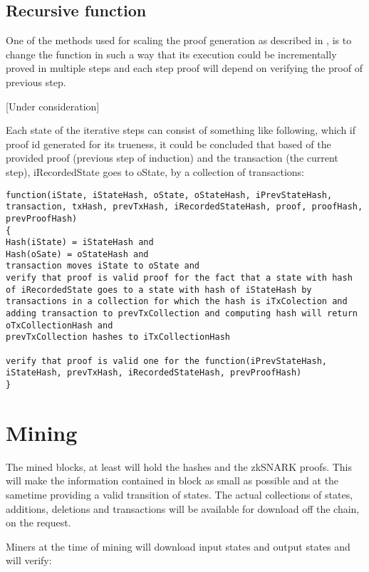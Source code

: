 \documentclass{article}
\begin{document}
\subsection{Recursive function}

One of the methods used for scaling the proof generation as described in \cite{scalableZKSNARK}, is to change the function in such a way that its execution could be incrementally proved in multiple steps and each step proof will depend on verifying the proof of previous step.

[Under consideration]

Each state of the iterative steps can consist of something like following, which if proof id generated for its trueness, it could be concluded that based of the provided proof (previous step of induction) and the transaction (the current step), iRecordedState goes to oState, by a collection of transactions:

\begin{lstlisting}
function(iState, iStateHash, oState, oStateHash, iPrevStateHash, transaction, txHash, prevTxHash, iRecordedStateHash, proof, proofHash, prevProofHash)
{
Hash(iState) = iStateHash and
Hash(oSate) = oStateHash and
transaction moves iState to oState and
verify that proof is valid proof for the fact that a state with hash of iRecordedState goes to a state with hash of iStateHash by transactions in a collection for which the hash is iTxColection and
adding transaction to prevTxCollection and computing hash will return oTxCollectionHash and
prevTxCollection hashes to iTxCollectionHash

verify that proof is valid one for the function(iPrevStateHash, iStateHash, prevTxHash, iRecordedStateHash, prevProofHash)
}

\end{lstlisting}

\section{Mining}

The mined blocks, at least will hold the hashes and the zkSNARK proofs. This will make the information contained in block as small as possible and at the sametime providing a valid transition of states. The actual collections of states, additions, deletions and transactions will be available for download off the chain, on the request.

Miners at the time of mining will download input states and output states and will verify:
\end{document}
